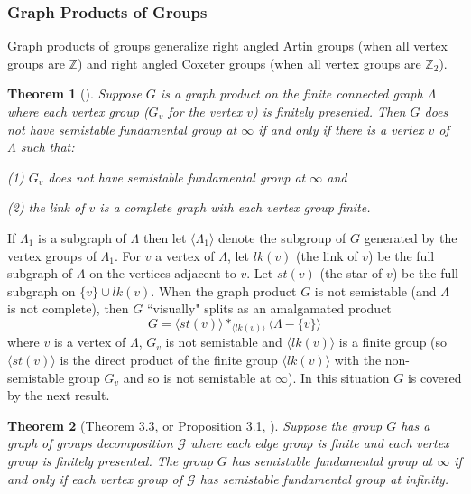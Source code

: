 \documentclass[12pt]{article}
\newtheorem{theorem}{Theorem}[subsection]
\begin{document}
\subsubsection{Graph Products of Groups}\label{GPofG}
Graph products of groups generalize right angled Artin groups (when all vertex groups are $\mathbb Z$)  and right angled Coxeter groups (when all vertex groups are $\mathbb Z_2$). 

\begin{theorem} [\cite {MMGP}]\label{GraphP}   
Suppose $G$ is a graph product on the finite connected graph $\Lambda$ where each vertex group ($G_v$ for the vertex $v$) is finitely presented. Then $G$ does not have semistable fundamental group at $\infty$ if and only if there is a vertex $v$ of $\Lambda$ such that: 

(1) $G_v$ does not have semistable fundamental group at $\infty$ and  

(2) the link of $v$ is a complete graph with each vertex group finite.
\end{theorem} 

If $\Lambda_1$ is a subgraph of $\Lambda$ then let $\langle \Lambda_1\rangle$ denote the subgroup of $G$ generated by the vertex groups of $\Lambda_1$. For $v$ a vertex of $\Lambda$, let $lk(v)$ (the link of $v$)  be the full subgraph of $\Lambda$ on the vertices adjacent to $v$. Let $st(v)$ (the star of $v$) be the full subgraph on $\{v\}\cup lk(v)$. 
When the graph product $G$ is not semistable (and $\Lambda$ is not complete), then $G$ ``visually" splits as an amalgamated product 
$$G=\langle st(v)\rangle \ast_{\langle lk(v)\rangle} \langle \Lambda-\{v\}\rangle$$
where $v$ is a vertex of $\Lambda$, $G_v$ is not semistable and $\langle lk(v)\rangle$ is a finite group (so $\langle st(v)\rangle$ is the direct product of the finite group $\langle lk(v)\rangle$ with the non-semistable group $G_v$ and so is not semistable at $\infty$). In this situation $G$ is covered by the next result.  

\begin{theorem} [Theorem 3.3, \cite{MMGP} or Proposition 3.1, \cite{CLQR21}] \label{Fsplit}
 Suppose the group $G$ has a graph of groups decomposition $\mathcal G$ where each edge group is finite and each vertex group is finitely presented. The group $G$ has semistable fundamental group at $\infty$  if and only if each vertex group of $\mathcal G$ has semistable fundamental group at infinity. 
\end{theorem}

\end{document}
